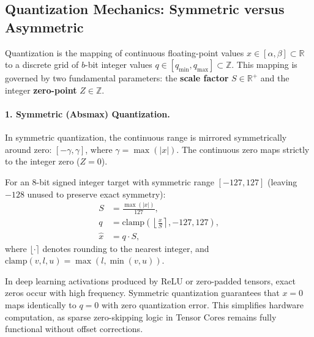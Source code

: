 \documentclass[../../../main.tex]{subfiles}
\begin{document}
\subsection{Quantization Mechanics: Symmetric versus Asymmetric}
\label{subsec:quantization_mechanics}

Quantization is the mapping of continuous floating-point values $x \in [\alpha, \beta] \subset \mathbb{R}$ to a discrete grid of $b$-bit integer values $q \in [q_{\min}, q_{\max}] \subset \mathbb{Z}$. This mapping is governed by two fundamental parameters: the \textbf{scale factor} $S \in \mathbb{R}^+$ and the integer \textbf{zero-point} $Z \in \mathbb{Z}$.

\paragraph{1. Symmetric (Absmax) Quantization.}
In symmetric quantization, the continuous range is mirrored symmetrically around zero: $[-\gamma, \gamma]$, where $\gamma = \max(|x|)$. The continuous zero maps strictly to the integer zero ($Z = 0$).

For an 8-bit signed integer target with symmetric range $[-127, 127]$ (leaving $-128$ unused to preserve exact symmetry):
\begin{align}
\label{eq:absmax_scale}
S &= \frac{\max(|x|)}{127}, \\
\label{eq:absmax_quant}
q &= \text{clamp}\left(\left\lfloor \frac{x}{S} \right\rceil, -127, 127\right), \\
\label{eq:absmax_dequant}
\hat{x} &= q \cdot S,
\end{align}
where $\lfloor \cdot \rceil$ denotes rounding to the nearest integer, and $\text{clamp}(v, l, u) = \max(l, \min(v, u))$.

\begin{intuition}
In deep learning activations produced by ReLU or zero-padded tensors, exact zeros occur with high frequency. Symmetric quantization guarantees that $x = 0$ maps identically to $q = 0$ with zero quantization error. This simplifies hardware computation, as sparse zero-skipping logic in Tensor Cores remains fully functional without offset corrections.
\end{intuition}
\end{document}
